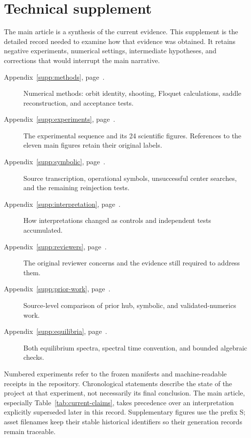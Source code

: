 \section*{Technical supplement}
\label{supp:start}

The main article is a synthesis of the current evidence. This supplement is
the detailed record needed to examine how that evidence was obtained.
It retains negative experiments, numerical settings, intermediate hypotheses,
and corrections that would interrupt the main narrative.

\begin{description}
\item[Appendix~\ref{supp:methods}, page~\pageref{supp:methods}.]
Numerical methods: orbit identity, shooting, Floquet calculations, saddle
reconstruction, and acceptance tests.
\item[Appendix~\ref{supp:experiments}, page~\pageref{supp:experiments}.]
The experimental sequence and its 24 scientific figures.
References to the eleven main figures retain their original labels.
\item[Appendix~\ref{supp:symbolic}, page~\pageref{supp:symbolic}.]
Source transcription, operational symbols, unsuccessful center searches,
and the remaining reinjection tests.
\item[Appendix~\ref{supp:interpretation}, page~\pageref{supp:interpretation}.]
How interpretations changed as controls and independent tests accumulated.
\item[Appendix~\ref{supp:reviewers}, page~\pageref{supp:reviewers}.]
The original reviewer concerns and the evidence still required to address them.
\item[Appendix~\ref{supp:prior-work}, page~\pageref{supp:prior-work}.]
Source-level comparison of prior hub, symbolic, and validated-numerics work.
\item[Appendix~\ref{supp:equilibria}, page~\pageref{supp:equilibria}.]
Both equilibrium spectra, spectral time convention, and bounded algebraic checks.
\end{description}

Numbered experiments refer to the frozen manifests and machine-readable
receipts in the repository. Chronological statements describe the state of
the project at that experiment, not necessarily its final conclusion.
The main article, especially Table~\ref{tab:current-claims}, takes precedence
over an interpretation explicitly superseded later in this record.
Supplementary figures use the prefix S; asset filenames keep their stable
historical identifiers so their generation records remain traceable.

\clearpage
